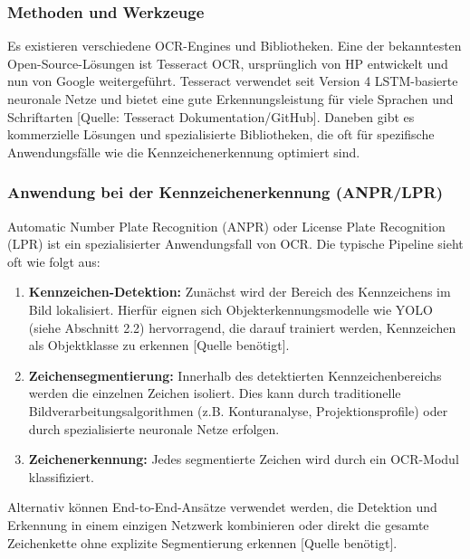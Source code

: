 \subsubsection{Methoden und Werkzeuge}
Es existieren verschiedene OCR-Engines und Bibliotheken. Eine der bekanntesten Open-Source-Lösungen ist Tesseract OCR, ursprünglich von HP entwickelt und nun von Google weitergeführt. Tesseract verwendet seit Version 4 LSTM-basierte neuronale Netze und bietet eine gute Erkennungsleistung für viele Sprachen und Schriftarten [Quelle: Tesseract Dokumentation/GitHub]. Daneben gibt es kommerzielle Lösungen und spezialisierte Bibliotheken, die oft für spezifische Anwendungsfälle wie die Kennzeichenerkennung optimiert sind.

\subsubsection{Anwendung bei der Kennzeichenerkennung (ANPR/LPR)}
Automatic Number Plate Recognition (ANPR) oder License Plate Recognition (LPR) ist ein spezialisierter Anwendungsfall von OCR. Die typische Pipeline sieht oft wie folgt aus:

\begin{enumerate}
    \item \textbf{Kennzeichen-Detektion:} Zunächst wird der Bereich des Kennzeichens im Bild lokalisiert. Hierfür eignen sich Objekterkennungsmodelle wie YOLO (siehe Abschnitt 2.2) hervorragend, die darauf trainiert werden, Kennzeichen als Objektklasse zu erkennen [Quelle benötigt].

    \item \textbf{Zeichensegmentierung:} Innerhalb des detektierten Kennzeichenbereichs werden die einzelnen Zeichen isoliert. Dies kann durch traditionelle Bildverarbeitungsalgorithmen (z.B. Konturanalyse, Projektionsprofile) oder durch spezialisierte neuronale Netze erfolgen.

    \item \textbf{Zeichenerkennung:} Jedes segmentierte Zeichen wird durch ein OCR-Modul klassifiziert.
\end{enumerate}

Alternativ können End-to-End-Ansätze verwendet werden, die Detektion und Erkennung in einem einzigen Netzwerk kombinieren oder direkt die gesamte Zeichenkette ohne explizite Segmentierung erkennen [Quelle benötigt].

